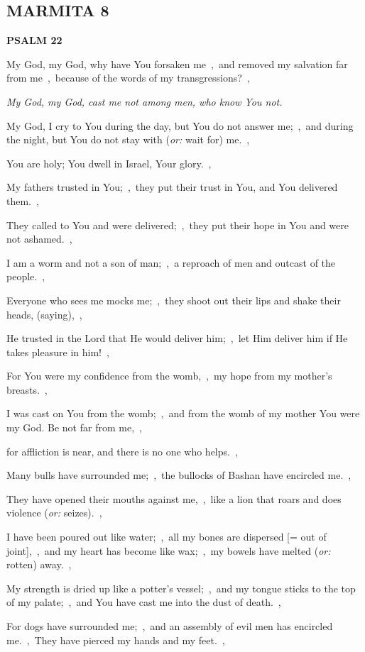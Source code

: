 \documentclass[12pt,twoside,a5paper]{article}
\newcommand{\marmita}[1]{\subsection*{MARMITA {#1}}}
\newcommand{\psalm}[1]{\textbf{PSALM {#1}}}
\newcommand{\qanona}[1]{{\liturgicalhint{Qanona.} \emph{#1}}}
\newcommand{\translationoption}[1]{\emph{or:} #1}
\begin{document}
\marmita{8}

\psalm{22}

\begin{normalparskip}
  My God, my God, why have You forsaken me~\sep\ and removed my salvation far from me~\sep\ because of the words of my transgressions?~\sep

  \qanona{My God, my God, cast me not among men, who know You not.}

  My God, I cry to You during the day, but You do not answer me;~\sep\ and during the night, but You do not stay with (\translationoption{wait for}) me.~\sep

  You are holy; You dwell in Israel, Your glory.~\sep

  My fathers trusted in You;~\sep\ they put their trust in You, and You delivered them.~\sep

  They called to You and were delivered;~\sep\ they put their hope in You and were not ashamed.~\sep

  I am a worm and not a son of man;~\sep\ a reproach of men and outcast of the people.~\sep

  Everyone who sees me mocks me;~\sep\ they shoot out their lips and shake their heads, (saying),~\sep

  He trusted in the Lord that He would deliver him;~\sep\ let Him deliver him if He takes pleasure in him!~\sep

  For You were my confidence from the womb,~\sep\ my hope from my mother's breasts.~\sep

  I was cast on You from the womb;~\sep\ and from the womb of my mother You were my God. Be not far from me,~\sep

  for affliction is near, and there is no one who helps.~\sep

  Many bulls have surrounded me;~\sep\ the bullocks of Bashan have encircled me.~\sep

  They have opened their mouths against me,~\sep\ like a lion that roars and does violence (\translationoption{seizes}).~\sep

  I have been poured out like water;~\sep\ all my bones are dispersed [= out of joint],~\sep\ and my heart has become like wax;~\sep\ my bowels have melted (\translationoption{rotten}) away.~\sep

  My strength is dried up like a potter's vessel;~\sep\ and my tongue sticks to the top of my palate;~\sep\ and You have cast me into the dust of death.~\sep

  For dogs have surrounded me;~\sep\ and an assembly of evil men has encircled me.~\sep\ They have pierced my hands and my feet.~\sep


\end{normalparskip}
\end{document}

